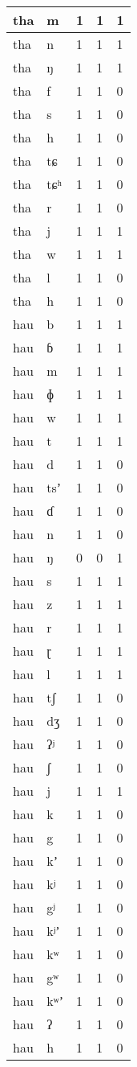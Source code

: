 \begin{longtable}{ | l | l | l | l | l | }
	tha & m & 1 & 1 & 1 \\ \hline
	tha & n & 1 & 1 & 1 \\ \hline
	tha & ŋ & 1 & 1 & 1 \\ \hline
	tha & f & 1 & 1 & 0 \\ \hline
	tha & s & 1 & 1 & 0 \\ \hline
	tha & h & 1 & 1 & 0 \\ \hline
	tha & tɕ & 1 & 1 & 0 \\ \hline
	tha & tɕʰ & 1 & 1 & 0 \\ \hline
	tha & r & 1 & 1 & 0 \\ \hline
	tha & j & 1 & 1 & 1 \\ \hline
	tha & w & 1 & 1 & 1 \\ \hline
	tha & l & 1 & 1 & 0 \\ \hline
	tha & h & 1 & 1 & 0 \\ \hline
	hau & b & 1 & 1 & 1 \\ \hline
	hau & ɓ & 1 & 1 & 1 \\ \hline
	hau & m & 1 & 1 & 1 \\ \hline
	hau & ɸ & 1 & 1 & 1 \\ \hline
	hau & w & 1 & 1 & 1 \\ \hline
	hau & t & 1 & 1 & 1 \\ \hline
	hau & d & 1 & 1 & 0 \\ \hline
	hau & tsʼ & 1 & 1 & 0 \\ \hline
	hau & ɗ & 1 & 1 & 0 \\ \hline
	hau & n & 1 & 1 & 0 \\ \hline
	hau & ŋ & 0 & 0 & 1 \\ \hline
	hau & s & 1 & 1 & 1 \\ \hline
	hau & z & 1 & 1 & 1 \\ \hline
	hau & r & 1 & 1 & 1 \\ \hline
	hau & ɽ & 1 & 1 & 1 \\ \hline
	hau & l & 1 & 1 & 1 \\ \hline
	hau & tʃ & 1 & 1 & 0 \\ \hline
	hau & dʒ & 1 & 1 & 0 \\ \hline
	hau & ʔʲ & 1 & 1 & 0 \\ \hline
	hau & ʃ & 1 & 1 & 0 \\ \hline
	hau & j & 1 & 1 & 1 \\ \hline
	hau & k & 1 & 1 & 0 \\ \hline
	hau & g & 1 & 1 & 0 \\ \hline
	hau & kʼ & 1 & 1 & 0 \\ \hline
	hau & kʲ & 1 & 1 & 0 \\ \hline
	hau & gʲ & 1 & 1 & 0 \\ \hline
	hau & kʲʼ & 1 & 1 & 0 \\ \hline
	hau & kʷ & 1 & 1 & 0 \\ \hline
	hau & gʷ & 1 & 1 & 0 \\ \hline
	hau & kʷʼ & 1 & 1 & 0 \\ \hline
	hau & ʔ & 1 & 1 & 0 \\ \hline
	hau & h & 1 & 1 & 0 \\ \hline
\end{longtable}